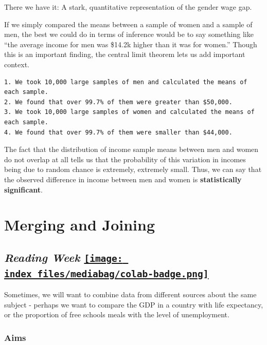 \documentclass[
  letterpaper,
  DIV=11,
  numbers=noendperiod]{scrreprt}
\begin{document}
There we have it: A stark, quantitative representation of the gender
wage gap.

If we simply compared the means between a sample of women and a sample
of men, the best we could do in terms of inference would be to say
something like ``the average income for men was \$14.2k higher than it
was for women.'' Though this is an important finding, the central limit
theorem lets us add important context.

\begin{verbatim}
1. We took 10,000 large samples of men and calculated the means of each sample.
2. We found that over 99.7% of them were greater than $50,000. 
3. We took 10,000 large samples of women and calculated the means of each sample.
4. We found that over 99.7% of them were smaller than $44,000.
\end{verbatim}

The fact that the distribution of income sample means between men and
women do not overlap at all tells us that the probability of this
variation in incomes being due to random chance is extremely, extremely
small. Thus, we can say that the observed difference in income between
men and women is \textbf{statistically significant}.


\hypertarget{merging-and-joining}{%
\chapter{Merging and Joining}\label{merging-and-joining}}

\hypertarget{reading-week-open-in-colab}{%
\section[\emph{Reading Week} ]{\texorpdfstring{\emph{Reading Week}
\href{https://colab.research.google.com/github/oballinger/QM2/blob/main/notebooks/RW.\%20Merging\%20and\%20Joining.ipynb}{\protect\texttt{[image: index\_files/mediabag/colab-badge.png]}}}{Reading Week Open In Colab}}\label{reading-week-open-in-colab}}

Sometimes, we will want to combine data from different sources about the
same subject - perhaps we want to compare the GDP in a country with life
expectancy, or the proportion of free schools meals with the level of
unemployment.

\hypertarget{aims-3}{%
\subsection{Aims}\label{aims-3}}
\end{document}
